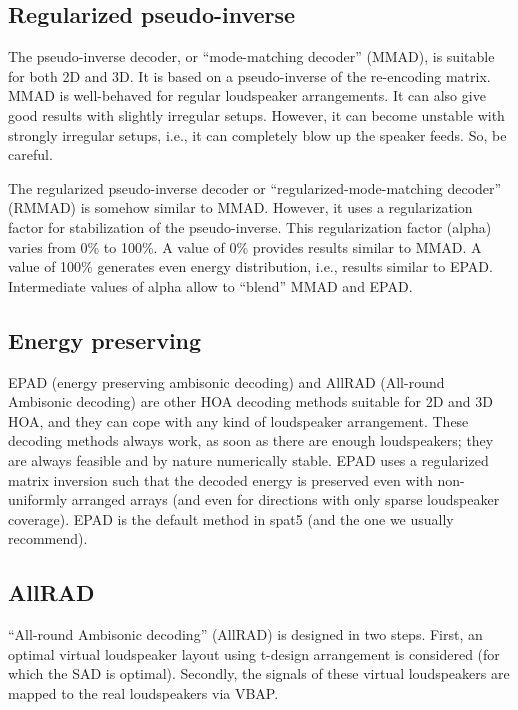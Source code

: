 \documentclass[
  letterpaper,
  DIV=11,
  numbers=noendperiod]{scrreport}
\begin{document}
\hypertarget{regularized-pseudo-inverse}{%
\subsection{Regularized
pseudo-inverse}\label{regularized-pseudo-inverse}}

The pseudo-inverse decoder, or ``mode-matching decoder'' (MMAD), is
suitable for both 2D and 3D. It is based on a pseudo-inverse of the
re-encoding matrix. MMAD is well-behaved for regular loudspeaker
arrangements. It can also give good results with slightly irregular
setups. However, it can become unstable with strongly irregular setups,
i.e., it can completely blow up the speaker feeds. So, be careful.

The regularized pseudo-inverse decoder or ``regularized-mode-matching
decoder'' (RMMAD) is somehow similar to MMAD. However, it uses a
regularization factor for stabilization of the pseudo-inverse. This
regularization factor (alpha) varies from 0\% to 100\%. A value of 0\%
provides results similar to MMAD. A value of 100\% generates even energy
distribution, i.e., results similar to EPAD. Intermediate values of
alpha allow to ``blend'' MMAD and EPAD.

\hypertarget{energy-preserving}{%
\subsection{Energy preserving}\label{energy-preserving}}

EPAD (energy preserving ambisonic decoding) and AllRAD (All-round
Ambisonic decoding) are other HOA decoding methods suitable for 2D and
3D HOA, and they can cope with any kind of loudspeaker arrangement.
These decoding methods always work, as soon as there are enough
loudspeakers; they are always feasible and by nature numerically stable.
EPAD uses a regularized matrix inversion such that the decoded energy is
preserved even with non-uniformly arranged arrays (and even for
directions with only sparse loudspeaker coverage). EPAD is the default
method in spat5 (and the one we usually recommend).

\hypertarget{allrad}{%
\subsection{AllRAD}\label{allrad}}

``All-round Ambisonic decoding'' (AllRAD) is designed in two steps.
First, an optimal virtual loudspeaker layout using t-design arrangement
is considered (for which the SAD is optimal). Secondly, the signals of
these virtual loudspeakers are mapped to the real loudspeakers via VBAP.
\end{document}
